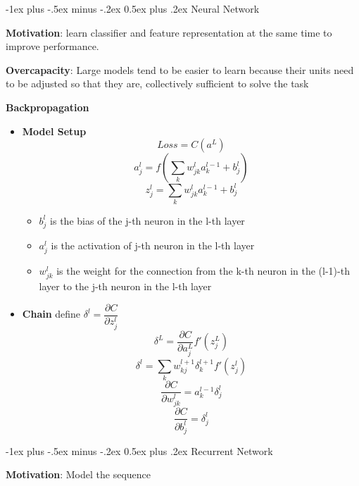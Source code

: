 \documentclass[a4paper, 10pt,landscape]{article}
\makeatletter
\renewcommand{\section}{\@startsection{section}{1}{0mm}%
                                {-1ex plus -.5ex minus -.2ex}%
                                {0.5ex plus .2ex}%
                                {\normalfont\large\bfseries}}
\makeatother
\begin{document}
\raggedright
\footnotesize
\begin{multicols*}{3}

\setlength{\premulticols}{1pt}
\setlength{\postmulticols}{1pt}
\setlength{\multicolsep}{1pt}
\setlength{\columnsep}{2pt}


\section{Neural Network}
\begin{description}
	\item {\bf Motivation}: learn classifier and feature representation at the same time to improve performance. 
	\item {\bf Overcapacity}: Large models tend to be easier to learn because their units need to be adjusted so that they are, collectively sufficient to solve the task
	\item {\bf Backpropagation}~
		\begin{itemize}
			\item {\bf Model Setup}~
				$$Loss = C(a^L)$$
				$$a_j^l = f(\sum_k w_{jk}^l a_k^{l-1} + b_j^l)$$
				$$z_j^{l} = \sum_k w_{jk}^{l} a_k^{l-1} + b_j^l$$
					\begin{itemize}
						\item $b_j^l$ is the bias of the j-th neuron in the l-th layer
						\item $a_j^l$ is the activation of j-th neuron in the l-th layer
						\item $w_{jk}^l$ is the weight for the connection from the k-th neuron in the (l-1)-th layer to the j-th neuron in the l-th layer
					\end{itemize}
			\item {\bf Chain} define $\delta^l = \dfrac{\partial C}{\partial z_j^l}$
				$$\delta^{L} = \dfrac{\partial C}{\partial a_j^L}f'(z_j^L)$$
				$$\delta^l = \sum_k w_{kj}^{l+1}\delta_k^{l+1}f'(z_j^l)$$
				$$\dfrac{\partial C}{\partial w_{jk}^l} = a_k^{l-1} \delta_j^l$$
				$$\dfrac{\partial C}{\partial b_j^l} = \delta_j^l$$

		\end{itemize}
\end{description}


\section{Recurrent Network}
\begin{description}
	\item {\bf Motivation}: Model the sequence
\end{description}




\end{multicols*}
\end{document}

